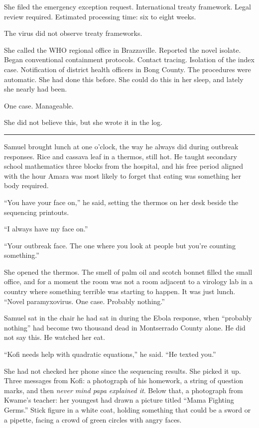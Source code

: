 She filed the emergency exception request. International treaty framework. Legal review required. Estimated processing time: six to eight weeks.

The virus did not observe treaty frameworks.

She called the WHO regional office in Brazzaville. Reported the novel isolate. Began conventional containment protocols. Contact tracing. Isolation of the index case. Notification of district health officers in Bong County. The procedures were automatic. She had done this before. She could do this in her sleep, and lately she nearly had been.

One case. Manageable.

She did not believe this, but she wrote it in the log.

\begin{center}\rule{0.3\linewidth}{0.4pt}\end{center}

Samuel brought lunch at one o'clock, the way he always did during outbreak responses. Rice and cassava leaf in a thermos, still hot. He taught secondary school mathematics three blocks from the hospital, and his free period aligned with the hour Amara was most likely to forget that eating was something her body required.

``You have your face on,'' he said, setting the thermos on her desk beside the sequencing printouts.

``I always have my face on.''

``Your outbreak face. The one where you look at people but you're counting something.''

She opened the thermos. The smell of palm oil and scotch bonnet filled the small office, and for a moment the room was not a room adjacent to a virology lab in a country where something terrible was starting to happen. It was just lunch. ``Novel paramyxovirus. One case. Probably nothing.''

Samuel sat in the chair he had sat in during the Ebola response, when ``probably nothing'' had become two thousand dead in Montserrado County alone. He did not say this. He watched her eat.

``Kofi needs help with quadratic equations,'' he said. ``He texted you.''

She had not checked her phone since the sequencing results. She picked it up. Three messages from Kofi: a photograph of his homework, a string of question marks, and then \emph{never mind papa explained it}. Below that, a photograph from Kwame's teacher: her youngest had drawn a picture titled ``Mama Fighting Germs.'' Stick figure in a white coat, holding something that could be a sword or a pipette, facing a crowd of green circles with angry faces.

